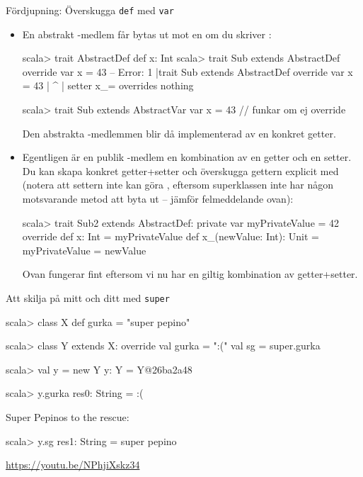 \begin{Slide}{Fördjupning: Överskugga \texttt{def} med \texttt{var}}\SlideFontTiny
\begin{itemize}
\item En abstrakt -medlem får bytas ut mot en  om du  skriver :
\begin{REPLsmall}
scala> trait AbstractDef { def x: Int }
scala> trait Sub extends AbstractDef { override var x = 43 }
-- Error:
1 |trait Sub extends AbstractDef { override var x = 43 }
  |                                             ^
  |                                             setter x_= overrides nothing

scala> trait Sub extends AbstractVar { var x = 43 }   // funkar om ej override
\end{REPLsmall}
Den abstrakta -medlemmen blir då implementerad av en konkret getter. 
\item Egentligen är en publik -medlem en kombination av en getter och en setter. Du kan skapa konkret getter+setter och överskugga gettern explicit med  (notera att settern inte kan göra , eftersom superklassen inte har någon motsvarande metod att byta ut -- jämför felmeddelande ovan):
\begin{REPLsmall}
scala> trait Sub2 extends AbstractDef:
         private var myPrivateValue = 42
         override def x: Int = myPrivateValue
         def x_(newValue: Int): Unit = myPrivateValue = newValue
\end{REPLsmall}
Ovan fungerar fint eftersom vi nu har en giltig kombination av getter+setter.
\end{itemize}
\end{Slide}


\begin{Slide}{Att skilja på mitt och ditt med \texttt{super}}
\begin{REPL}
scala> class X { def gurka = "super pepino" }

scala> class Y extends X:
         override val gurka = ":("
         val sg = super.gurka

scala> val y = new Y
y: Y = Y@26ba2a48

scala> y.gurka
res0: String = :(
\end{REPL}

\pause
Super Pepinos to the rescue:
\begin{REPLnonum}
scala> y.sg
res1: String = super pepino

\end{REPLnonum}


\pause
{}
\href{https://youtu.be/NPhjiXskz34}{\small https://youtu.be/NPhjiXskz34}
\end{Slide}





